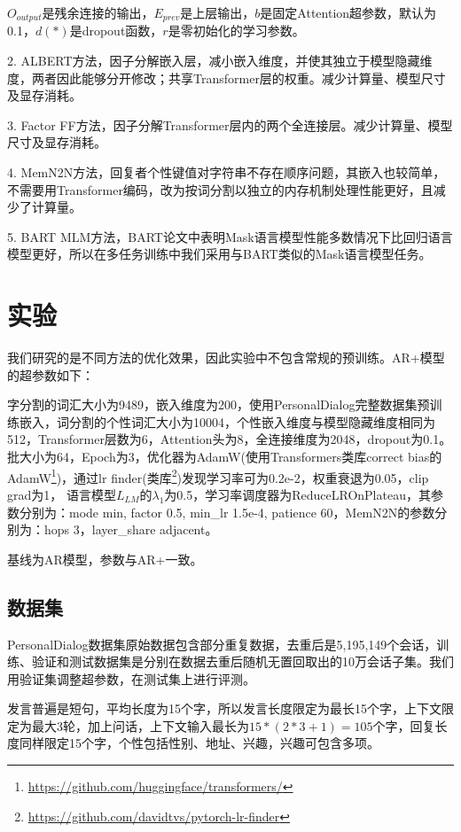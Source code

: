 \documentclass[letterpaper]{article} %
\DeclareRobustCommand{\citeext}[1]{\cite[#1]{#1}}
\begin{document}
\begin{CJK*}{UTF8}{gbsn}
$O_{output}$是残余连接的输出，$E_{prev}$是上层输出，$b$是固定Attention超参数，默认为0.1，$d(*)$是dropout函数，$r$是零初始化的学习参数。

2. ALBERT\citeext{Lan2019}方法，因子分解嵌入层，减小嵌入维度，并使其独立于模型隐藏维度，两者因此能够分开修改；共享Transformer层的权重。减少计算量、模型尺寸及显存消耗。

3. Factor FF方法，因子分解Transformer层内的两个全连接层。减少计算量、模型尺寸及显存消耗。

4. MemN2N\citeext{Sukhbaatar2015}方法，回复者个性键值对字符串不存在顺序问题，其嵌入也较简单，不需要用Transformer编码，改为按词分割以独立的内存机制处理性能更好，且减少了计算量。

5. BART MLM\citeext{Lewis2019}方法，BART论文中表明Mask语言模型性能多数情况下比回归语言模型更好，所以在多任务训练中我们采用与BART类似的Mask语言模型任务。

\section[Experiments]{实验} 
我们研究的是不同方法的优化效果，因此实验中不包含常规的预训练。AR+模型的超参数如下：

字分割的词汇大小为9489，嵌入维度为200，使用PersonalDialog完整数据集预训练嵌入，词分割的个性词汇大小为10004，个性嵌入维度与模型隐藏维度相同为512，Transformer层数为6，Attention头为8，全连接维度为2048，dropout为0.1。
批大小为64，Epoch为3，优化器为AdamW(使用Transformers类库correct bias的\\AdamW\footnote{\url{https://github.com/huggingface/transformers/}})，通过lr finder\citeext{Smith2015}(类库\footnote{\url{https://github.com/davidtvs/pytorch-lr-finder}})发现学习率可为0.2e-2，权重衰退为0.05，clip grad为1，
语言模型$L_{LM}$的$\lambda_1$为0.5，学习率调度器为ReduceLROnPlateau，其参数分别为：mode min, factor 0.5, min\_lr 1.5e-4, patience 60，MemN2N的参数分别为：hops 3，layer\_share adjacent。

基线为AR模型，参数与AR+一致。

\subsection[Datasets]{数据集} 
PersonalDialog数据集原始数据包含部分重复数据，去重后是5,195,149个会话，训练、验证和测试数据集是分别在数据去重后随机无置回取出的10万会话子集。我们用验证集调整超参数，在测试集上进行评测。

发言普遍是短句，平均长度为15个字，所以发言长度限定为最长15个字，上下文限定为最大3轮，加上问话，上下文输入最长为$15*(2*3+1)=105$个字，回复长度同样限定15个字，个性包括性别、地址、兴趣，兴趣可包含多项。


\end{CJK*}
\end{document}
